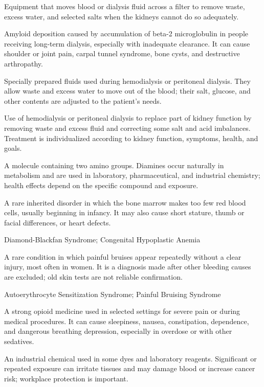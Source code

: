  Equipment that moves blood or dialysis fluid across a filter to remove waste, excess water, and selected salts when the kidneys cannot do so adequately.

 Amyloid deposition caused by accumulation of beta-2 microglobulin in people receiving long-term dialysis, especially with inadequate clearance. It can cause shoulder or joint pain, carpal tunnel syndrome, bone cysts, and destructive arthropathy.

 Specially prepared fluids used during hemodialysis or peritoneal dialysis. They allow waste and excess water to move out of the blood; their salt, glucose, and other contents are adjusted to the patient’s needs.

 Use of hemodialysis or peritoneal dialysis to replace part of kidney function by removing waste and excess fluid and correcting some salt and acid imbalances. Treatment is individualized according to kidney function, symptoms, health, and goals.

 A molecule containing two amino groups. Diamines occur naturally in metabolism and are used in laboratory, pharmaceutical, and industrial chemistry; health effects depend on the specific compound and exposure.

 A rare inherited disorder in which the bone marrow makes too few red blood cells, usually beginning in infancy. It may also cause short stature, thumb or facial differences, or heart defects.

\synonyms
Diamond-Blackfan Syndrome; Congenital Hypoplastic Anemia

 A rare condition in which painful bruises appear repeatedly without a clear injury, most often in women. It is a diagnosis made after other bleeding causes are excluded; old skin tests are not reliable confirmation.

\synonyms
Autoerythrocyte Sensitization Syndrome; Painful Bruising Syndrome

 A strong opioid medicine used in selected settings for severe pain or during medical procedures. It can cause sleepiness, nausea, constipation, dependence, and dangerous breathing depression, especially in overdose or with other sedatives.

 An industrial chemical used in some dyes and laboratory reagents. Significant or repeated exposure can irritate tissues and may damage blood or increase cancer risk; workplace protection is important.

